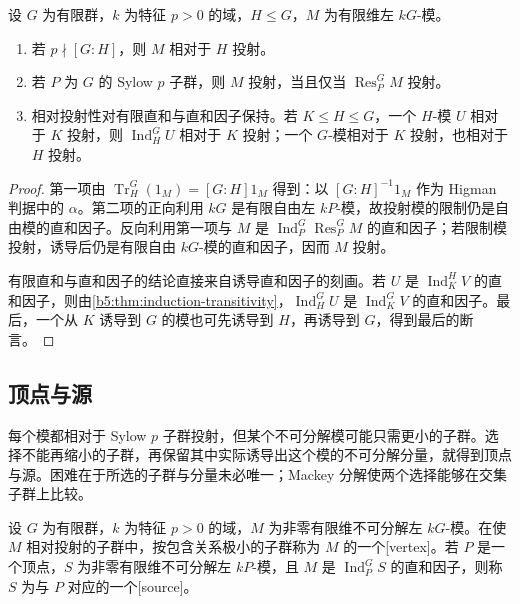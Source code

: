 \begin{proposition}\label{b5:prop:relative-sylow-projectivity}
	设 \(G\) 为有限群，\(k\) 为特征 \(p>0\) 的域，\(H\le G\)，\(M\) 为有限维左 \(kG\)-模。
	\begin{enumerate}
		\item 若 \(p\nmid[G:H]\)，则 \(M\) 相对于 \(H\) 投射。
		\item 若 \(P\) 为 \(G\) 的 Sylow \(p\) 子群，则 \(M\) 投射，当且仅当 \(\operatorname{Res}_P^G M\) 投射。
		\item 相对投射性对有限直和与直和因子保持。若 \(K\le H\le G\)，一个 \(H\)-模 \(U\) 相对于 \(K\) 投射，则 \(\operatorname{Ind}_H^G U\) 相对于 \(K\) 投射；一个 \(G\)-模相对于 \(K\) 投射，也相对于 \(H\) 投射。
	\end{enumerate}
\end{proposition}
\begin{proof}
	第一项由 \(\operatorname{Tr}_H^G(1_M)=[G:H]1_M\) 得到：以 \([G:H]^{-1}1_M\) 作为 Higman 判据中的 \(\alpha\)。第二项的正向利用 \(kG\) 是有限自由左 \(kP\)-模，故投射模的限制仍是自由模的直和因子。反向利用第一项与 \(M\) 是 \(\operatorname{Ind}_P^G\operatorname{Res}_P^G M\) 的直和因子；若限制模投射，诱导后仍是有限自由 \(kG\)-模的直和因子，因而 \(M\) 投射。

	有限直和与直和因子的结论直接来自诱导直和因子的刻画。若 \(U\) 是 \(\operatorname{Ind}_K^H V\) 的直和因子，则由\cref{b5:thm:induction-transitivity}，\(\operatorname{Ind}_H^G U\) 是 \(\operatorname{Ind}_K^G V\) 的直和因子。最后，一个从 \(K\) 诱导到 \(G\) 的模也可先诱导到 \(H\)，再诱导到 \(G\)，得到最后的断言。
\end{proof}

\subsection{顶点与源}
\label{b5:subsec:0805:03}

每个模都相对于 Sylow \(p\) 子群投射，但某个不可分解模可能只需更小的子群。选择不能再缩小的子群，再保留其中实际诱导出这个模的不可分解分量，就得到顶点与源。困难在于所选的子群与分量未必唯一；Mackey 分解使两个选择能够在交集子群上比较。

\begin{definition}\label{b5:def:vertex-source}
	设 \(G\) 为有限群，\(k\) 为特征 \(p>0\) 的域，\(M\) 为非零有限维不可分解左 \(kG\)-模。在使 \(M\) 相对投射的子群中，按包含关系极小的子群称为 \(M\) 的一个[vertex]。若 \(P\) 是一个顶点，\(S\) 为非零有限维不可分解左 \(kP\)-模，且 \(M\) 是 \(\operatorname{Ind}_P^G S\) 的直和因子，则称 \(S\) 为与 \(P\) 对应的一个[source]。
\end{definition}

